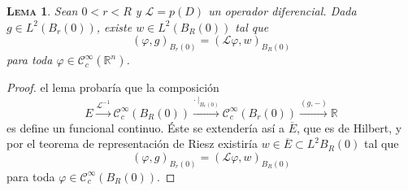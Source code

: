 \documentclass[11pt]{article}
\theoremstyle{colored}
\newtheorem{lemma}{\scshape Lema}
\newcommand{\R}{\mathbb{R}}
\newcommand{\C}{\mathscr{C}}
\renewcommand{\L}{\mathscr{L}}
\begin{document}
\begin{lemma} \label{lema-rep} Sean $0 < r < R$ y $\L = p(D)$ un operador diferencial. Dada $g \in L^2(B_r(0))$, existe $w\in L^2(B_R(0))$ tal que
\[
(\varphi,g)_{B_r(0)} = (\L \varphi, w)_{B_R(0)}
\]
para toda $\varphi \in \C_c^\infty(\R^n)$.
\end{lemma}
\begin{proof} el lema probaría que la composición
\[
E \xrightarrow{\L^{-1}} \C_c^\infty(B_R(0)) \xrightarrow{\cdot \ |_{B_r(0)}} \C_c^\infty(B_r(0)) \xrightarrow{(g,-)}  \R
\]
es define un funcional continuo. Éste se extendería así a $\overline{E}$, que es de Hilbert, y por el teorema de representación de Riesz existiría $w \in \overline{E} \subset L^2{B_R(0)}$ tal que
\[
(\varphi,g)_{B_r(0)} = (\L \varphi, w)_{B_R(0)}
\]
para toda $\varphi \in \C_c^\infty(B_R(0))$.  
\end{proof}
\end{document}
